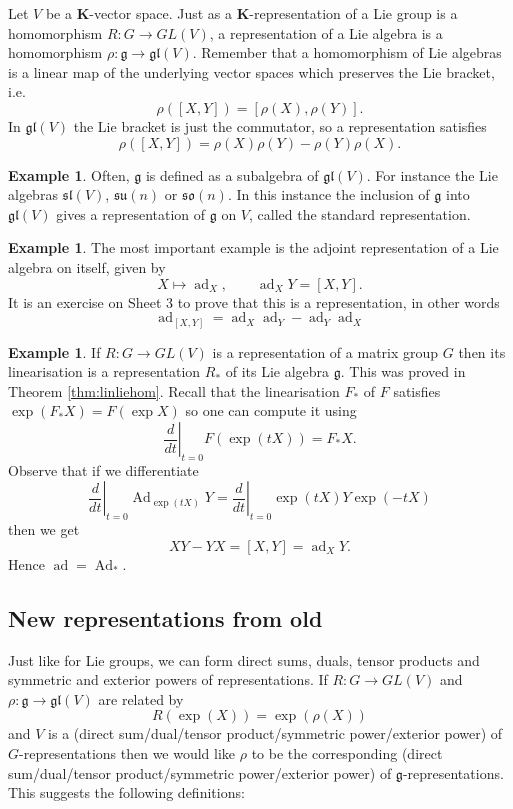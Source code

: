 \documentclass[12pt]{article}
\newcommand{\KK}{\mathbf{K}}
\newcommand{\OP}{\operatorname}
\theoremstyle{definition}
\newtheorem{exm}[thm]{Example}
\theoremstyle{check}
\theoremstyle{remark}
\theoremstyle{TheoremNum}
\begin{document}
Let $V$ be a $\KK$-vector space. Just as a $\KK$-representation of a Lie group is a homomorphism $R\colon G\to GL(V)$, a representation of a Lie algebra is a homomorphism $\rho\colon\mathfrak{g}\to\mathfrak{gl}(V)$. Remember that a homomorphism of Lie algebras is a linear map of the underlying vector spaces which preserves the Lie bracket, i.e.
\[\rho([X,Y])=[\rho(X),\rho(Y)].\]
In $\mathfrak{gl}(V)$ the Lie bracket is just the commutator, so a representation satisfies
\[\rho([X,Y])=\rho(X)\rho(Y)-\rho(Y)\rho(X).\]
\begin{exm}
Often, $\mathfrak{g}$ is defined as a subalgebra of $\mathfrak{gl}(V)$. For instance the Lie algebras $\mathfrak{sl}(V)$, $\mathfrak{su}(n)$ or $\mathfrak{so}(n)$. In this instance the inclusion of $\mathfrak{g}$ into $\mathfrak{gl}(V)$ gives a representation of $\mathfrak{g}$ on $V$, called the standard representation.
\end{exm}
\begin{exm}
The most important example is the adjoint representation of a Lie algebra on itself, given by
\[X\mapsto\OP{ad}_X,\qquad\OP{ad}_XY=[X,Y].\]
It is an exercise on Sheet 3 to prove that this is a representation, in other words
\[\OP{ad}_{[X,Y]}=\OP{ad}_X\OP{ad}_Y-\OP{ad}_Y\OP{ad}_X\]
\end{exm}
\begin{exm}
If $R\colon G\to GL(V)$ is a representation of a matrix group $G$ then its linearisation is a representation $R_*$ of its Lie algebra $\mathfrak{g}$. This was proved in Theorem \ref{thm:linliehom}. Recall that the linearisation $F_*$ of $F$ satisfies $\exp(F_*X)=F(\exp X)$ so one can compute it using
\[\left.\frac{d}{dt}\right|_{t=0}F(\exp(tX))=F_*X.\]
Observe that if we differentiate
\[\left.\frac{d}{dt}\right|_{t=0}\OP{Ad}_{\exp(tX)}Y=\left.\frac{d}{dt}\right|_{t=0}\exp(tX)Y\exp(-tX)\]
then we get
\[XY-YX=[X,Y]=\OP{ad}_XY.\]
Hence $\OP{ad}=\OP{Ad}_*$.
\end{exm}

\subsection{New representations from old}

Just like for Lie groups, we can form direct sums, duals, tensor products and symmetric and exterior powers of representations. If $R\colon G\to GL(V)$ and $\rho\colon\mathfrak{g}\to\mathfrak{gl}(V)$ are related by
\[R(\exp(X))=\exp(\rho(X))\]
and $V$ is a (direct sum/dual/tensor product/symmetric power/exterior power) of $G$-representations then we would like $\rho$ to be the corresponding (direct sum/dual/tensor product/symmetric power/exterior power) of $\mathfrak{g}$-representations. This suggests the following definitions:
\end{document}
